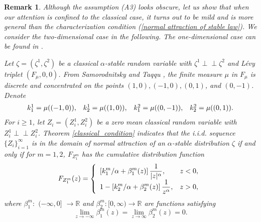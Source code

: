 \documentclass[a4paper,oneside,10pt]{article}%
\newtheorem{remark}[theorem]{Remark}
\numberwithin{equation}{section}
\begin{document}
\begin{remark}
\label{Remark} Although the assumption (A3) looks obscure, let us show that
when our attention is confined to the classical case, it turns out to be mild
and is more general than the characterization condition
(\ref{normal attraction of stable law}). We consider the two-dimensional case
in the following. The one-dimensional case can be found in \cite{BM2016}.

Let $\zeta=(\zeta^{1},\zeta^{2})$ be a classical $\alpha$-stable random
variable with $\zeta^{1}\perp \! \! \! \perp \zeta^{2}$ and L\'evy triplet
$(F_{\mu},0,0)$. From Samorodnitsky and Taqqu \cite[Example 2.3.5]{ST1994},
the finite measure $\mu$ in $F_{\mu}$ is discrete and concentrated on the
points $(1,0),(-1,0),(0,1)$, and $(0,-1)$. Denote
\[%
\begin{array}
[c]{llll}%
k_{1}^{1}=\mu((-1,0)), & k_{2}^{1}=\mu((1,0)), & k_{1}^{2}=\mu((0,-1)), &
k_{2}^{2}=\mu((0,1)).
\end{array}
\]
For $i\geq1$, let $Z_{i}=(Z_{i}^{1},Z_{i}^{2})$ be a zero mean classical
random variable with $Z_{i}^{1}\perp \! \! \! \perp Z_{i}^{2}$. Theorem
\ref{classical_condition} indicates that the i.i.d. sequence $\{Z_{i}%
\}_{i=1}^{\infty}$ is in the domain of normal attraction of an $\alpha$-stable
distribution $\zeta$ if and only if for $m=1,2$, $F_{Z_{1}^{m}}$ has the
cumulative distribution function
\[
F_{Z_{1}^{m}}(z)=\left \{
\begin{array}
[c]{ll}%
\displaystyle \left[  k_{1}^{m}/\alpha+\beta_{1}^{m}(z)\right]  \frac{1}{
|z|^{\alpha}}, & z<0,\\
\displaystyle1-\left[  k_{2}^{m}/\alpha+\beta_{2}^{m}(z)\right]  \frac{1}{
z^{\alpha}}, & z>0,
\end{array}
\right.
\]
where $\beta_{1}^{m}:$ $(-\infty,0]$ $\rightarrow \mathbb{R}$ and $\beta
_{2}^{m}:[0,\infty)\rightarrow \mathbb{R}$ are functions satisfying
\[
\lim_{z\rightarrow-\infty}\beta_{1}^{m}(z)=\lim_{z\rightarrow \infty}\beta
_{2}^{m}(z)=0.
\]



\end{remark}
\end{document}
